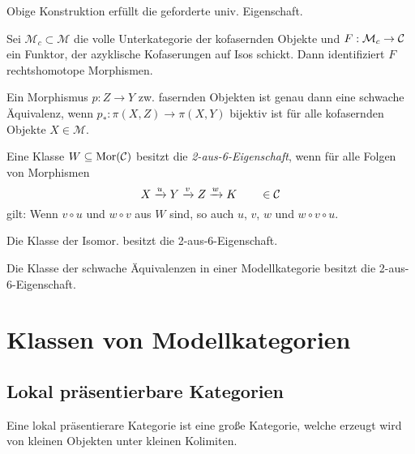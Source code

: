 \documentclass{cheat-sheet}
\newcommand{\ModC}{\mathcal{M}} %
\begin{document}
\begin{lem}
  Obige Konstruktion erfüllt die geforderte univ. Eigenschaft.
\end{lem}

\begin{lem}
  Sei $\ModC_c \subset \ModC$ die volle Unterkategorie der kofasernden Objekte und $F : \ModC_c \to \Cat$ ein Funktor, der azyklische Kofaserungen auf Isos schickt. Dann identifiziert $F$ rechtshomotope Morphismen.
\end{lem}

\begin{thm}
  Ein Morphismus $p : Z \to Y$ zw. fasernden Objekten ist genau dann eine schwache Äquivalenz, wenn $p_* : \pi(X, Z) \to \pi(X, Y)$ bijektiv ist für alle kofasernden Objekte $X \in \ModC$.
\end{thm}

\begin{defn}
  Eine Klasse $W \subseteq \operatorname{Mor}(\mathcal{C})$ besitzt die \emph{2-aus-6-Eigenschaft}, wenn für alle Folgen von Morphismen
  \[ X \xrightarrow{u} Y \xrightarrow{v} Z \xrightarrow{w} K \qquad \in \mathcal{C} \]
  gilt: Wenn $v \circ u$ und $w \circ v$ aus $W$ sind, so auch $u$, $v$, $w$ und $w \circ v \circ u$.
\end{defn}

\begin{beob}
  Die Klasse der Isomor. besitzt die 2-aus-6-Eigenschaft.
\end{beob}

\begin{kor}
  Die Klasse der schwache Äquivalenzen in einer Modellkategorie besitzt die 2-aus-6-Eigenschaft.
\end{kor}

\section{Klassen von Modellkategorien}

\subsection{Lokal präsentierbare Kategorien}


\begin{motto}
  Eine lokal präsentierare Kategorie ist eine große Kategorie, welche erzeugt wird von kleinen Objekten unter kleinen Kolimiten.
\end{motto}
\end{document}
